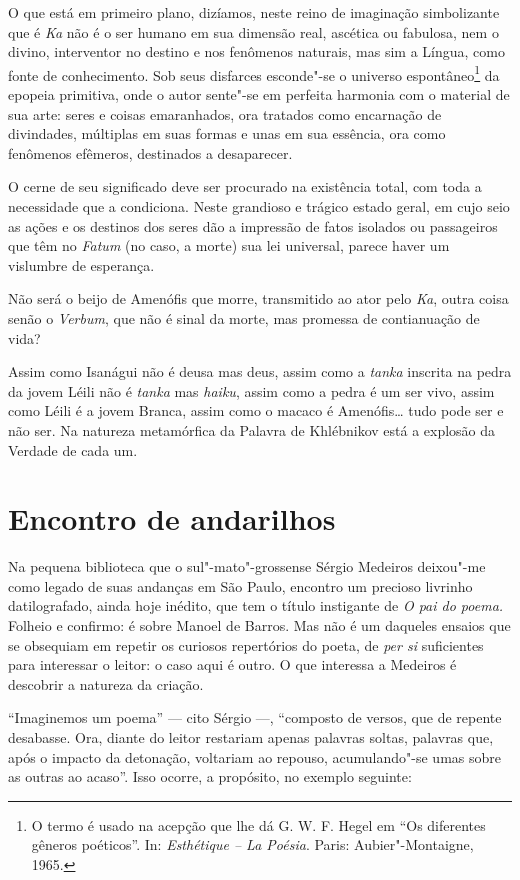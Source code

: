 O que está em primeiro plano, dizíamos, neste reino de imaginação
simbolizante que é \emph{Ka} não é o ser humano em sua dimensão real,
ascética ou fabulosa, nem o divino, interventor no destino e nos
fenômenos naturais, mas sim a Língua, como fonte de conhecimento. Sob
seus disfarces esconde"-se o universo espontâneo\footnote{O termo é usado
  na acepção que lhe dá G. W. F. Hegel em ``Os diferentes gêneros
  poéticos''. In: \emph{Esthétique -- La Poésia}. Paris: Aubier"-Montaigne,
  1965.} da epopeia primitiva, onde o autor sente"-se em perfeita
harmonia com o material de sua arte: seres e coisas emaranhados, ora
tratados como encarnação de divindades, múltiplas em suas formas e unas
em sua essência, ora como fenômenos efêmeros, destinados a desaparecer.

O cerne de seu significado deve ser procurado na existência total, com
toda a necessidade que a condiciona. Neste grandioso e trágico estado
geral, em cujo seio as ações e os destinos dos seres dão a impressão de
fatos isolados ou passageiros que têm no \emph{Fatum} (no caso, a morte)
sua lei universal, parece haver um vislumbre de esperança.

Não será o beijo de Amenófis que morre, transmitido ao ator pelo
\emph{Ka}, outra coisa senão o \emph{Verbum}, que não é sinal da morte,
mas promessa de contianuação de vida?

Assim como Isanágui não é deusa mas deus, assim como a \emph{tanka}
inscrita na pedra da jovem Léili não é \emph{tanka} mas \emph{haiku},
assim como a pedra é um ser vivo, assim como Léili é a jovem Branca,
assim como o macaco é Amenófis\ldots{} tudo pode ser e não ser. Na natureza
metamórfica da Palavra de Khlébnikov está a explosão da Verdade de cada
um.

\chapter{Encontro de andarilhos}

Na pequena biblioteca que o sul"-mato"-grossense Sérgio Medeiros deixou"-me
como legado de suas andanças em São Paulo, encontro um precioso livrinho
datilografado, ainda hoje inédito, que tem o título instigante de
\emph{O pai do poema.} Folheio e confirmo: é sobre Manoel de Barros. Mas
não é um daqueles ensaios que se obsequiam em repetir os curiosos
repertórios do poeta, de \emph{per si} suficientes para interessar o
leitor: o caso aqui é outro. O que interessa a Medeiros é descobrir a
natureza da criação.

``Imaginemos um poema'' --- cito Sérgio ---, ``composto de versos, que de
repente desabasse. Ora, diante do leitor restariam apenas palavras
soltas, palavras que, após o impacto da detonação, voltariam ao repouso,
acumulando"-se umas sobre as outras ao acaso''. Isso ocorre, a propósito,
no exemplo seguinte:

